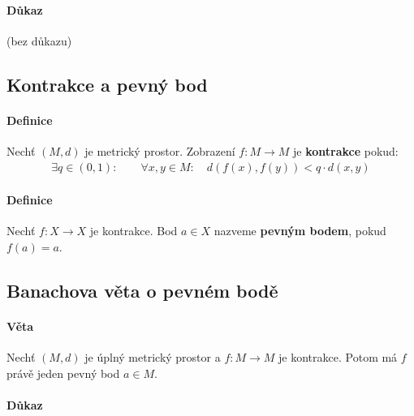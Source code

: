\documentclass[a4paper,10pt]{article}
\begin{document}
\paragraph{Důkaz}
(bez důkazu)


\subsection{Kontrakce a pevný bod}
\setcounter{equation}{0}
\paragraph{Definice}
Nechť $(M, d)$ je metrický prostor. Zobrazení $f: M \to M$ je \textbf{kontrakce} pokud:
\begin{align*}
	\exists q \in (0,1): \qquad 
	\forall x, y \in M: \quad d(f(x), f(y)) \lt q \cdot d(x, y)
\end{align*}
\paragraph{Definice}
Nechť $f: X \to X$ je kontrakce. Bod $a \in X$ nazveme \textbf{pevným bodem}, pokud $f(a)
= a$.


\subsection{Banachova věta o pevném bodě}
\setcounter{equation}{0}
\paragraph{Věta}
Nechť $(M, d)$ je úplný metrický prostor a $f: M \to M$ je kontrakce. Potom má
$f$ právě jeden pevný bod $a \in M$.
\paragraph{Důkaz}
\end{document}
